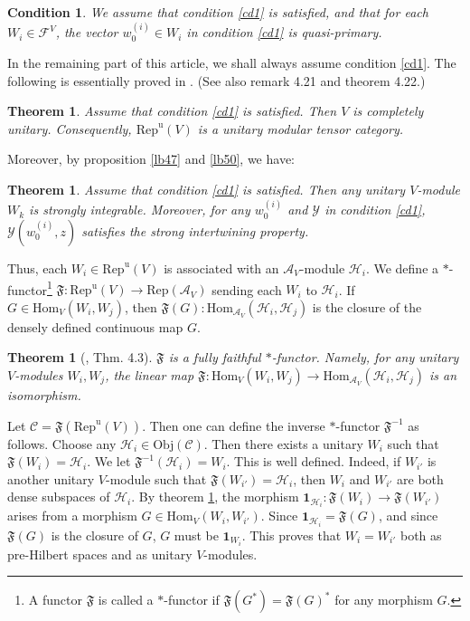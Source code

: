 \documentclass[12pt,a4paper]{article}
\theoremstyle{definition}
\theoremstyle{plain}
\newtheorem{thm}[df]{Theorem}
\newtheorem{cond}{Condition}
\newcommand{\fk}{\mathfrak}
\newcommand{\mc}{\mathcal}
\newcommand{\id}{\mathbf{1}}
\newcommand{\Hom}{\mathrm{Hom}}
\newcommand{\Rep}{\mathrm{Rep}}
\newcommand{\scr}{\mathscr}
\newcommand{\RepuV}{\mathrm{Rep}^{\mathrm u}(V)}
\newcommand{\Obj}{\mathrm{Obj}}
\numberwithin{equation}{subsection}
\begin{document}
\begin{cond}\label{cd2}
We assume that condition \ref{cd1} is satisfied, and that for each $W_i\in\mc F^V$, the vector $w^{(i)}_0\in W_i$ in condition \ref{cd1} is quasi-primary.
\end{cond}

In the remaining part of this article,  we shall always assume  condition \ref{cd1}. The following is essentially proved in \cite{Gui19b}. (See also \cite{Gui21a} remark 4.21 and theorem 4.22.)

\begin{thm}\label{lb51}
Assume that condition \ref{cd1} is satisfied.  Then $V$ is completely unitary. Consequently, $\RepuV$ is a unitary modular tensor category.
\end{thm} 

Moreover, by proposition \ref{lb47} and  \ref{lb50}, we have:

\begin{thm}\label{lb55}
Assume that condition \ref{cd1} is satisfied. Then any unitary $V$-module $W_k$ is strongly integrable. Moreover, for any $w^{(i)}_0$ and $\mc Y$ in condition \ref{cd1}, $\mc Y(w^{(i)}_0,z)$ satisfies the strong intertwining property.
\end{thm}




Thus,  each $W_i\in\RepuV$ is associated with an $\mc A_V$-module $\mc H_i$. We define a $*$-functor\footnote{A functor $\fk F$ is called a $*$-functor if $\fk F(G^*)=\fk F(G)^*$ for any morphism $G$.} $\fk F:\RepuV\rightarrow \Rep(\mc A_V)$ sending each $W_i$ to $\mc H_i$. If $G\in\Hom_V(W_i,W_j)$, then $\fk F(G):\Hom_{\mc A_V}(\mc H_i,\mc H_j)$ is the closure of the densely defined continuous map $G$.

\begin{thm}[\cite{CWX}, \cite{Gui19b} Thm. 4.3]\label{lb54}
$\fk F$ is a fully faithful $*$-functor. Namely, for any unitary $V$-modules $W_i,W_j$, the linear map $\fk F:\Hom_V(W_i,W_j)\rightarrow\Hom_{\mc A_V}(\mc H_i,\mc H_j)$ is an isomorphism.
\end{thm}

Let $\scr C=\fk F(\RepuV)$. Then one can define the inverse $*$-functor $\fk F^{-1}$ as follows. Choose any $\mc H_i\in\Obj(\scr C)$. Then there exists a unitary $W_i$ such that $\fk F(W_i)=\mc H_i$. We let $\fk F^{-1}(\mc H_i)=W_i$. This is well defined. Indeed, if $W_{i'}$ is another unitary $V$-module such that $\fk F(W_{i'})=\mc H_i$, then $W_i$ and $W_{i'}$ are both dense subspaces of $\mc H_i$. By theorem \ref{lb54}, the morphism $\id_{\mc H_i}:\fk F(W_i)\rightarrow\fk F(W_{i'})$ arises from a morphism $G\in\Hom_V(W_i,W_{i'})$. Since $\id_{\mc H_i}=\fk F (G)$, and since $\fk F(G)$ is the closure of $G$, $G$ must be $\id_{W_i}$. This proves that $W_i=W_{i'}$ both as pre-Hilbert spaces and as unitary $V$-modules.
\end{document}
